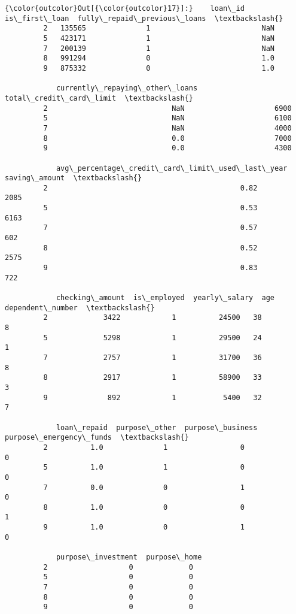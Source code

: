 \documentclass{report}
\begin{document}
            \begin{Verbatim}[commandchars=\\\{\}]
{\color{outcolor}Out[{\color{outcolor}17}]:}    loan\_id  is\_first\_loan  fully\_repaid\_previous\_loans  \textbackslash{}
         2   135565              1                          NaN   
         5   423171              1                          NaN   
         7   200139              1                          NaN   
         8   991294              0                          1.0   
         9   875332              0                          1.0   
         
            currently\_repaying\_other\_loans  total\_credit\_card\_limit  \textbackslash{}
         2                             NaN                     6900   
         5                             NaN                     6100   
         7                             NaN                     4000   
         8                             0.0                     7000   
         9                             0.0                     4300   
         
            avg\_percentage\_credit\_card\_limit\_used\_last\_year  saving\_amount  \textbackslash{}
         2                                             0.82           2085   
         5                                             0.53           6163   
         7                                             0.57            602   
         8                                             0.52           2575   
         9                                             0.83            722   
         
            checking\_amount  is\_employed  yearly\_salary  age  dependent\_number  \textbackslash{}
         2             3422            1          24500   38                 8   
         5             5298            1          29500   24                 1   
         7             2757            1          31700   36                 8   
         8             2917            1          58900   33                 3   
         9              892            1           5400   32                 7   
         
            loan\_repaid  purpose\_other  purpose\_business  purpose\_emergency\_funds  \textbackslash{}
         2          1.0              1                 0                        0   
         5          1.0              1                 0                        0   
         7          0.0              0                 1                        0   
         8          1.0              0                 0                        1   
         9          1.0              0                 1                        0   
         
            purpose\_investment  purpose\_home  
         2                   0             0  
         5                   0             0  
         7                   0             0  
         8                   0             0  
         9                   0             0  
\end{Verbatim}
        
\end{document}
